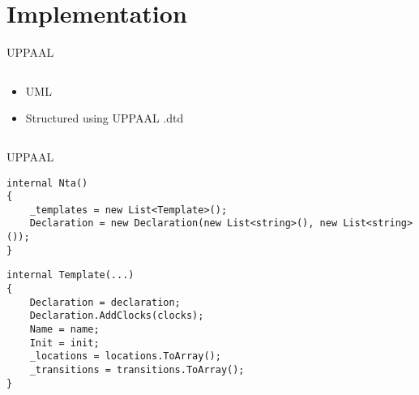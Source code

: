 \section{Implementation}
\begin{frame}{UPPAAL}
    \begin{columns}
        \begin{column}{0.4\textwidth}
            \begin{itemize}
                \item UML
                \item Structured using UPPAAL .dtd
            \end{itemize}
        \end{column}
        \begin{column}{0.6\textwidth}
            \scalebox{0.8}{
                
            }
        \end{column}
    \end{columns}

\end{frame}
\begin{frame}[fragile]{UPPAAL}

    \begin{lstlisting}
internal Nta()
{
    _templates = new List<Template>();
    Declaration = new Declaration(new List<string>(), new List<string>());
}    
    \end{lstlisting}
    \vspace{1em}
    \begin{lstlisting}
internal Template(...)
{
    Declaration = declaration;
    Declaration.AddClocks(clocks);
    Name = name;
    Init = init;
    _locations = locations.ToArray();
    _transitions = transitions.ToArray();
}  
    \end{lstlisting}
\end{frame}


